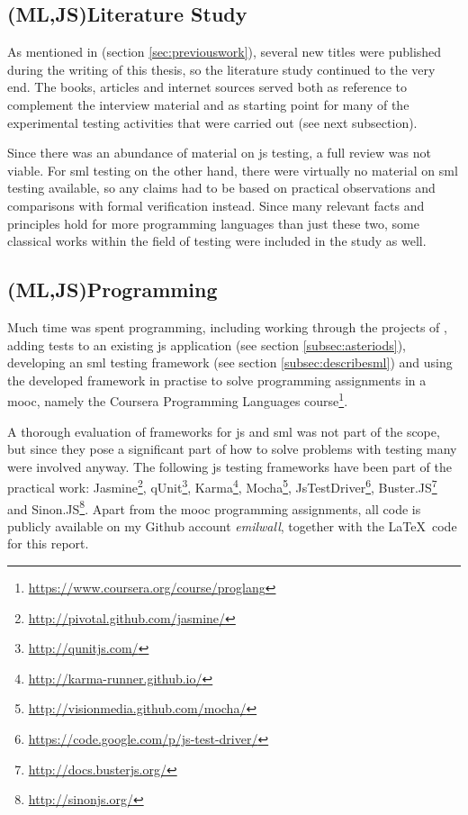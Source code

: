 \documentclass[11pt]{article}
\begin{document}
\subsection{(ML,JS)Literature Study}

As mentioned in  (section \ref{sec:previouswork}), several new titles were published during the writing of this thesis, so the literature study continued to the very end. The books, articles and internet sources served both as reference to complement the interview material and as starting point for many of the experimental testing activities that were carried out (see next subsection).

Since there was an abundance of material on \gls{js} testing, a full review was not viable. For \gls{sml} testing on the other hand, there were virtually no material on \gls{sml} testing available, so any claims had to be based on practical observations and comparisons with formal verification instead. Since many relevant facts and principles hold for more programming languages than just these two, some classical works within the field of testing were included in the study as well.

\subsection{(ML,JS)Programming}
\label{subsec:programming}

Much time was spent programming, including working through the projects of \cite[part~III]{Tddjs}, adding tests to an existing \gls{js} application (see section \ref{subsec:asteriods}), developing an \gls{sml} testing framework (see section \ref{subsec:describesml}) and using the developed framework in practise to solve programming assignments in a \gls{mooc}, namely the Coursera Programming Languages course\footnote{\url{https://www.coursera.org/course/proglang}}.

A thorough evaluation of frameworks for \gls{js} and \gls{sml} was not part of the scope, but since they pose a significant part of how to solve problems with testing many were involved anyway. The following \gls{js} testing frameworks have been part of the practical work:
Jasmine\footnote{\url{http://pivotal.github.com/jasmine/}},
qUnit\footnote{\url{http://qunitjs.com/}},
Karma\footnote{\url{http://karma-runner.github.io/}},
Mocha\footnote{\url{http://visionmedia.github.com/mocha/}},
JsTestDriver\footnote{\url{https://code.google.com/p/js-test-driver/}},
Buster.JS\footnote{\url{http://docs.busterjs.org/}} and
Sinon.JS\footnote{\url{http://sinonjs.org/}}. Apart from the \gls{mooc} programming assignments, all code is publicly available on my Github account \emph{emilwall}, together with the \LaTeX~code for this report.
\end{document}
